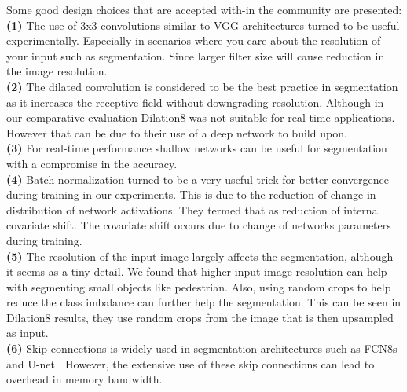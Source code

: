 \documentclass[conference]{IEEEtran}
\begin{document}
Some good design choices that are accepted with-in the community are presented:\\
\textbf{(1)} The use of 3x3 convolutions similar to VGG architectures \cite{simonyan2014very} turned to be useful experimentally. Especially in scenarios where you care about the resolution of your input such as segmentation. Since larger filter size will cause reduction in the image resolution.\\
\textbf{(2)} The dilated convolution is considered to be the best practice in segmentation as it increases the receptive field without downgrading resolution. Although in our comparative evaluation Dilation8 was not suitable for real-time applications. However that can be due to their use of a deep network to build upon.\\
\textbf{(3)} For real-time performance shallow networks can be useful for segmentation with a compromise in the accuracy.\\
\textbf{(4)} Batch normalization \cite{ioffe2015batch} turned to be a very useful trick for better convergence during training in our experiments. This is due to the reduction of change in distribution of network activations. They termed that as reduction of internal covariate shift. The covariate shift occurs due to change of networks parameters during training.\\
\textbf{(5)} The resolution of the input image largely affects the segmentation, although it seems as a tiny detail. We found that higher input image resolution can help with segmenting small objects like pedestrian. Also, using random crops to help reduce the class imbalance can further help the segmentation. This can be seen in Dilation8 results, they use random crops from the image that is then upsampled as input.\\
\textbf{(6)} Skip connections is widely used in segmentation architectures such as FCN8s \cite{long2015fully} and U-net \cite{ronneberger2015u}. However, the extensive use of these skip connections can lead to overhead in memory bandwidth. \\
\end{document}
